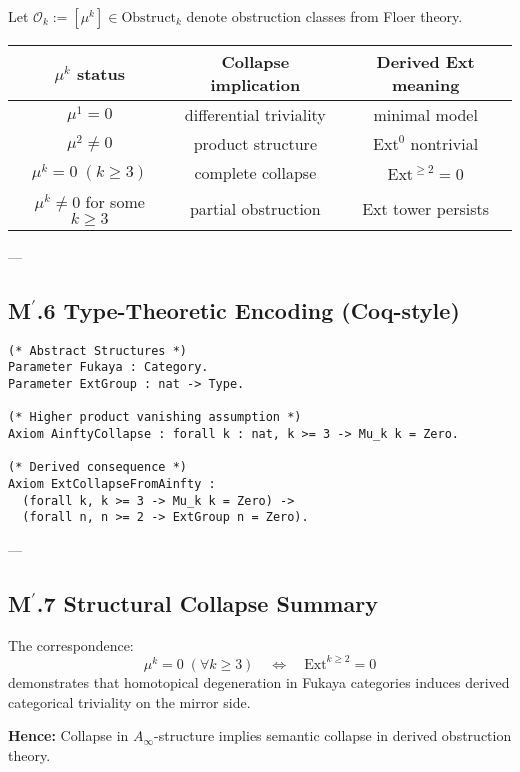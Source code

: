 \documentclass[11pt]{article}
\begin{document}
\begin{axiom}
\begin{axiom}
{{Let \( \mathcal{O}_k := [\mu^k] \in \mathrm{Obstruct}_k \)  
denote obstruction classes from Floer theory.

\begin{center}
\begin{tabular}{|c|c|c|}
\hline
$\mu^k$ status & Collapse implication & Derived Ext meaning \\
\hline
$\mu^1 = 0$ & differential triviality & minimal model \\
$\mu^2 \neq 0$ & product structure & $\mathrm{Ext}^0$ nontrivial \\
$\mu^k = 0 \; (k \geq 3)$ & complete collapse & $\mathrm{Ext}^{\geq 2} = 0$ \\
$\mu^k \neq 0$ for some $k \geq 3$ & partial obstruction & Ext tower persists \\
\hline
\end{tabular}
\end{center}

---

\subsection*{M$^\prime$.6 Type-Theoretic Encoding (Coq-style)}

\begin{lstlisting}[language=Coq, caption=A∞–Ext Collapse Formalization in Coq]
(* Abstract Structures *)
Parameter Fukaya : Category.
Parameter ExtGroup : nat -> Type.

(* Higher product vanishing assumption *)
Axiom AinftyCollapse : forall k : nat, k >= 3 -> Mu_k k = Zero.

(* Derived consequence *)
Axiom ExtCollapseFromAinfty :
  (forall k, k >= 3 -> Mu_k k = Zero) ->
  (forall n, n >= 2 -> ExtGroup n = Zero).
\end{lstlisting}

---

\subsection*{M$^\prime$.7 Structural Collapse Summary}

The correspondence:
\[
\mu^k = 0 \; (\forall k \geq 3) \quad \Longleftrightarrow \quad \mathrm{Ext}^{k \geq 2} = 0
\]
demonstrates that homotopical degeneration in Fukaya categories  
induces derived categorical triviality on the mirror side.

\textbf{Hence:}  
Collapse in \( A_\infty \)-structure implies semantic collapse in derived obstruction theory.

}}
\end{axiom}
\end{axiom}
\end{document}
